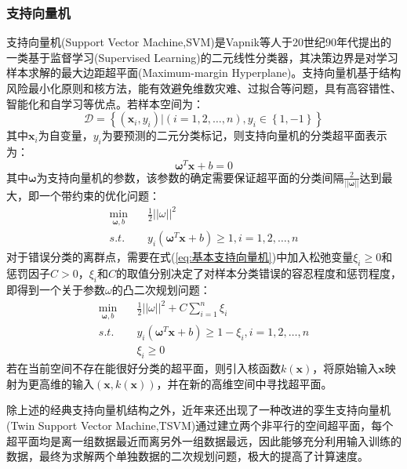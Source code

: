 \documentclass[a4paper]{ctexart}
\begin{document}
\subsubsection{支持向量机}
支持向量机(Support Vector Machine,SVM)是Vapnik等人于20世纪90年代提出的一类基于监督学习(Supervised Learning)的二元线性分类器，其决策边界是对学习样本求解的最大边距超平面(Maximum-margin Hyperplane)\cite{RN90}。支持向量机基于结构风险最小化原则和核方法，能有效避免维数灾难、过拟合等问题，具有高容错性、智能化和自学习等优点\cite{RN185}。若样本空间为：
$$\mathcal{D}=\left\{(\bm x_i,y_i)|(i=1,2,\dots,n),y_i\in\left\{1,-1\right\}\right\}$$
其中$\bm x_i$为自变量，$y_i$为要预测的二元分类标记，则支持向量机的分类超平面表示为\cite{RN90}：
\begin{equation}
	\bm\omega^T\bm x+b=0
\end{equation}
其中$\bm\omega$为支持向量机的参数，该参数的确定需要保证超平面的分类间隔$\frac{2}{||\bm\omega||}$达到最大，即一个带约束的优化问题：
\begin{equation}\label{eq:基本支持向量机}
	\begin{split}
		\mathop{min}\limits_{\bm\omega,b}&\quad\frac{1}{2}||\omega||^2\\
		s.t.&\quad y_i(\bm\omega^T\bm x+b)\geq 1,i=1,2,\dots,n
	\end{split}
\end{equation}
对于错误分类的离群点，需要在式(\ref{eq:基本支持向量机})中加入松弛变量$\xi_i\geq 0$和惩罚因子$C>0$，$\xi_i$和$C$的取值分别决定了对样本分类错误的容忍程度和惩罚程度，即得到一个关于参数$\omega$的凸二次规划问题\cite{RN188}：
\begin{equation}
	\begin{split}
		\mathop{min}\limits_{\bm\omega,b}&\quad\frac{1}{2}||\omega||^2+C\sum_{i=1}^n\xi_i\\
		s.t.&\quad y_i(\bm\omega^T\bm x+b)\geq 1-\xi_i,i=1,2,\dots,n\\
		&\quad \xi_i\geq 0
	\end{split}
\end{equation}
若在当前空间不存在能很好分类的超平面，则引入核函数$k\left(\bm x\right)$，将原始输入$\bm x$映射为更高维的输入$\left(\bm x,k\left(\bm x\right)\right)$，并在新的高维空间中寻找超平面。

除上述的经典支持向量机结构之外，近年来还出现了一种改进的孪生支持向量机(Twin Support Vector Machine,TSVM)通过建立两个非平行的空间超平面，每个超平面均是离一组数据最近而离另外一组数据最远，因此能够充分利用输入训练的数据，最终为求解两个单独数据的二次规划问题，极大的提高了计算速度\cite{RN191,RN192}。
\end{document}
